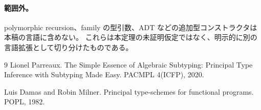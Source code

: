\documentclass[uplatex,dvipdfmx,a4paper,10.5pt]{jsarticle}
\theoremstyle{jpplain}
\begin{document}
\paragraph{範囲外。}
polymorphic recursion、family の型引数、ADT などの追加型コンストラクタは本稿の言語に含めない。
これらは本定理の未証明仮定ではなく、明示的に別の言語拡張として切り分けたものである。

\begin{thebibliography}{9}
Lionel Parreaux.
\newblock The Simple Essence of Algebraic Subtyping: Principal Type Inference with Subtyping Made Easy.
\newblock PACMPL 4(ICFP), 2020.

Luis Damas and Robin Milner.
\newblock Principal type-schemes for functional programs.
\newblock POPL, 1982.
\end{thebibliography}
\end{document}

